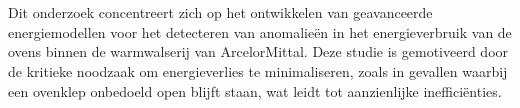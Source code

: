 
%
%
%
%
%

%



\chapter*{}


Dit onderzoek concentreert zich op het ontwikkelen van geavanceerde energiemodellen voor het detecteren van anomalieën in het energieverbruik van de ovens binnen de warmwalserij van ArcelorMittal. Deze studie is gemotiveerd door de kritieke noodzaak om energieverlies te minimaliseren, zoals in gevallen waarbij een ovenklep onbedoeld open blijft staan, wat leidt tot aanzienlijke inefficiënties.

